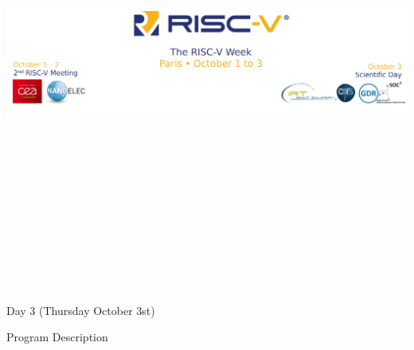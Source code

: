 \documentclass{beamer}
\begin{document}
\begin{frame}[t]
    \begin{center}
    \includegraphics[height=15cm]{./images/banner.png}
    \end{center}
    \begin{block}{\centering Day 3 (Thursday October 3st) }
        \vspace{1cm}
        {}
    \end{block}

    \begin{block}{\centering Program Description}
    \begin{multicols}{2}
        
    \end{multicols}
    \end{block}
\end{frame}
\end{document}
